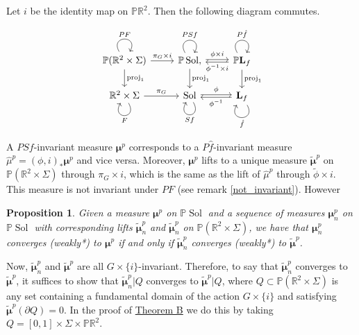 \documentclass[11pt,letterpaper,reqno]{article}
\newtheorem{proposition}{Proposition}[section]
\newcommand{\Pp}{\mathbb P}
\newcommand{\RR}{\mathbb{R}^2}
\newcommand{\hTTf}[1][f]{\mathbf{L}_{#1}}
\newcommand{\hf}{\hat{f}}
\newcommand{\bmu}{\boldsymbol{\mu}}
\newcommand{\tbmu}{\tilde{\bmu}}
\newcommand{\hmu}{\hat{\mu}}
\newcommand{\Sol}{\operatorname{Sol}}
\newcommand{\proj}{\operatorname{proj}}
\newcommand{\fsol}{Sf}
\begin{document}
 Let $i$ be the identity map on $\Pp \RR$. Then the following diagram commutes.

 \begin{equation}
\begin{tikzcd}
\Pp(\RR \times \Sigma) \ar[r, "\pi_G \times i"] \ar[d, "\proj_1"] \ar[loop, out=120, in=60, distance=20, "PF"]
& \Pp \Sol \ar[r, "\phi \times i", shift left = 0.3ex] 
\ar[d, "\proj_1"], \ar[loop, out=120, in=60, distance=20, "P\fsol"]
& \Pp \hTTf \ar[d, "\proj_1"] 
\ar[l, "\phi^{-1} \times i", shift left = 0.3ex] 
\ar[loop, out=120, in=60, distance=20, "P\hf"] \\
\RR \times \Sigma \ar[r, "\pi_G"] \ar[loop, out=300, in=240, distance=20, "F"]
& \Sol \ar[r, "\phi", shift left = 0.3ex] \ar[loop, out=300, in=240, distance=20, "\fsol"]
& \hTTf \ar[l, "\phi^{-1}", shift left = 0.3ex] \ar[loop, out=300, in=240, distance=20, "\hf"]
\end{tikzcd}
 \end{equation}

 A $PS f$-invariant measure $\bmu^p$ corresponds to a $P \hf$-invariant measure $\hmu^p = (\phi, i)_*\bmu^p$ and vice versa. Moreover, $\bmu^p$ lifts to a unique measure $\tbmu^p$ on $\Pp(\RR \times \Sigma)$ through $\pi_G \times i$, which is the same as the lift of $\hmu^p$ through $\tilde{\phi}\times i$. This measure is not invariant under $PF$ (see remark \ref{not_invariant}). However

 \begin{proposition}\label{convergence_on_projetive_bundles}
Given a measure $\bmu^{p}$ on $\Pp \Sol$ and a sequence of measures $\bmu_n^{p}$ on $\Pp \Sol$ with corresponding lifts $\tbmu_n^{p}$ and $\tbmu_n^{p}$ on $\Pp (\RR \times \Sigma)$, we have that $\bmu_n^{p}$ converges (weakly*) to $\bmu^{p}$ if and only if $\tbmu_n^{p}$ converges (weakly*) to $\tbmu^{p}$. 
 \end{proposition}

 Now, $\tbmu_n^p$ and $\tbmu^p$ are all $G \times\{i\}$-invariant. Therefore, to say that $\tbmu_n^p$ converges to $\tbmu^p$, it suffices to show that $\tbmu_n^p \vert Q$ converges to $\tbmu^p \vert Q$, where $Q \subset \Pp (\RR \times \Sigma)$ is any set containing a fundamental domain of the action $G \times \{ i \}$ and satisfying $\tbmu^p( \partial Q)=0.$ In the proof of \hyperlink{theoremB}{Theorem B} we do this by taking $Q = [0,1] \times \Sigma \times \Pp \RR$.
\end{document}
